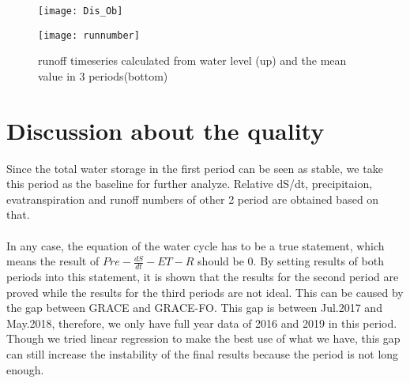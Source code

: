 \begin{figure}[htbp]
	\centering
	\begin{minipage}[t]{0.9\textwidth}
		\centering
		\texttt{[image: Dis\_Ob]} %
	\end{minipage}
	\begin{minipage}[t]{0.9\textwidth}
		\centering
		\texttt{[image: runnumber]} %
	\end{minipage}
	\caption{runoff timeseries calculated from water level (up) and the mean value in 3 periods(bottom) }
	\label{fig:runoff}
\end{figure}
\clearpage
\section{Discussion about the quality}
Since the total water storage in the first period can be seen as stable, we take this period as the baseline for further analyze. Relative dS/dt, precipitaion, evatranspiration and runoff numbers of other 2 period are obtained based on that. \\\\
In any case, the equation of the water cycle has to be a true statement, which means the result of $Pre-\frac{dS}{dt}-ET-R$ should be 0. By setting results of both periods into this statement, it is shown that the results for the second period are proved while the results for the third periods are not ideal. This can be caused by the gap between GRACE and GRACE-FO. This gap is between Jul.2017 and May.2018, therefore, we only have full year data of 2016 and 2019 in this period. Though we tried linear regression to make the best use of what we have, this gap can still increase the instability of the final results because the period is not long enough. 
